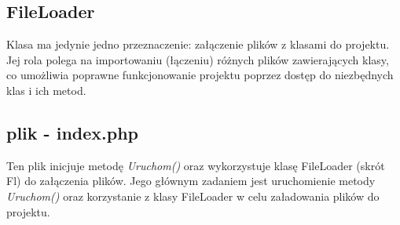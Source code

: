 \subsection{FileLoader}    
    Klasa ma jedynie jedno przeznaczenie: załączenie plików z klasami do projektu. Jej rola polega na importowaniu (łączeniu) różnych plików zawierających klasy, co umożliwia poprawne funkcjonowanie projektu poprzez dostęp do niezbędnych klas i ich metod.
      

\subsection{plik - index.php}    
Ten plik inicjuje metodę \textit{Uruchom()} oraz wykorzystuje klasę FileLoader (skrót Fl) do załączenia plików. Jego głównym zadaniem jest uruchomienie metody \textit{Uruchom()} oraz korzystanie z klasy FileLoader w celu załadowania plików do projektu.
      